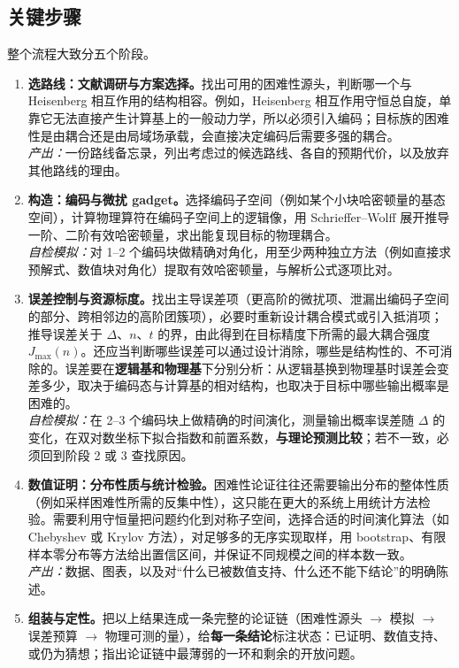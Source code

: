 \documentclass[11pt,a4paper,fontset=none]{ctexart}
\begin{document}
\subsection{关键步骤}

\noindent 整个流程大致分五个阶段。

\begin{enumerate}[label=\textbf{阶段 \arabic*}\quad,leftmargin=0pt,itemindent=*,itemsep=0.6em]
  \item \textbf{选路线：文献调研与方案选择。}找出可用的困难性源头，判断哪一个与 Heisenberg 相互作用的结构相容。例如，Heisenberg 相互作用守恒总自旋，单靠它无法直接产生计算基上的一般动力学，所以必须引入编码；目标族的困难性是由耦合还是由局域场承载，会直接决定编码后需要多强的耦合。\\
  \emph{产出：}一份路线备忘录，列出考虑过的候选路线、各自的预期代价，以及放弃其他路线的理由。

  \item \textbf{构造：编码与微扰 gadget。}选择编码子空间（例如某个小块哈密顿量的基态空间），计算物理算符在编码子空间上的逻辑像，用 Schrieffer--Wolff 展开推导一阶、二阶有效哈密顿量，求出能复现目标的物理耦合。\\
  \emph{自检模拟：}对 1--2 个编码块做精确对角化，用至少两种独立方法（例如直接求预解式、数值块对角化）提取有效哈密顿量，与解析公式逐项比对。

  \item \textbf{误差控制与资源标度。}找出主导误差项（更高阶的微扰项、泄漏出编码子空间的部分、跨相邻边的高阶团簇项），必要时重新设计耦合模式或引入抵消项；推导误差关于 $\Delta$、$n$、$t$ 的界，由此得到在目标精度下所需的最大耦合强度 $J_{\max}(n)$。还应当判断哪些误差可以通过设计消除，哪些是结构性的、不可消除的。误差要在\textbf{逻辑基和物理基}下分别分析：从逻辑基换到物理基时误差会变差多少，取决于编码态与计算基的相对结构，也取决于目标中哪些输出概率是困难的。\\
  \emph{自检模拟：}在 2--3 个编码块上做精确的时间演化，测量输出概率误差随 $\Delta$ 的变化，在双对数坐标下拟合指数和前置系数，\textbf{与理论预测比较}；若不一致，必须回到阶段 2 或 3 查找原因。

  \item \textbf{数值证明：分布性质与统计检验。}困难性论证往往还需要输出分布的整体性质（例如采样困难性所需的反集中性），这只能在更大的系统上用统计方法检验。需要利用守恒量把问题约化到对称子空间，选择合适的时间演化算法（如 Chebyshev 或 Krylov 方法），对足够多的无序实现取样，用 bootstrap、有限样本零分布等方法给出置信区间，并保证不同规模之间的样本数一致。\\
  \emph{产出：}数据、图表，以及对“什么已被数值支持、什么还不能下结论”的明确陈述。

  \item \textbf{组装与定性。}把以上结果连成一条完整的论证链（困难性源头 $\to$ 模拟 $\to$ 误差预算 $\to$ 物理可测的量），给\textbf{每一条结论}标注状态：已证明、数值支持、或仍为猜想；指出论证链中最薄弱的一环和剩余的开放问题。
\end{enumerate}
\end{document}
